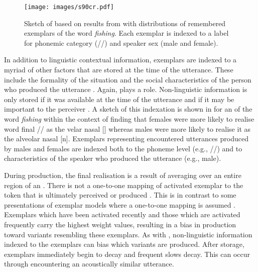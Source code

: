 \begin{figure}
  \texttt{[image: images/s90cr.pdf]} %
	\caption{Sketch of  based on results from \citet{trudgill1972} with distributions of remembered exemplars of the word \textit{fishing}.  Each exemplar is indexed to a label for phonemic category ({/{\ng}/}) and speaker sex (male and female).} 	\label{fig:with-phoneme-social-labels}
	
\end{figure} 

In addition to linguistic contextual information, exemplars are indexed to a myriad of other factors that are stored at the time of the utterance.  These include the formality of the situation and the social characteristics of the person who produced the utterance \citep{johnson1997,foulkesanddocherty2006}.  Again,  plays a role. Non-linguistic information is only stored if it was available at the time of the utterance and if it may be important to the perceiver \citep[147]{johnson1997}.  A sketch of this indexation is shown in  for an  of the word \textit{fishing} within the context of  finding that females were more likely to realise word final {/{\ng}/} as the velar nasal {[{\ng}]} whereas males were more likely to realise it as the alveolar nasal {[n]}.  Exemplars representing encountered utterances produced by males and females are indexed both to the phoneme level (e.g., {/{\ng}/}) and to characteristics of the speaker who produced the utterance (e.g., male).  


During production, the final realisation is a result of averaging over an entire region of an . There is not a one-to-one mapping of activated exemplar to the token that is ultimately perceived or produced \citep{pierrehumbert2001}.  This is in contrast to some presentations of exemplar models where a one-to-one mapping is assumed \citep{griffithsetal2007}.  Exemplars which have been activated recently and those which are activated frequently carry the highest weight values, resulting in a bias in production toward variants resembling these exemplars.  As with , non-linguistic information indexed to the exemplars can bias which variants are produced.  After storage, exemplars immediately begin to decay and frequent  slows decay.  This  can occur through encountering an acoustically similar utterance. 

